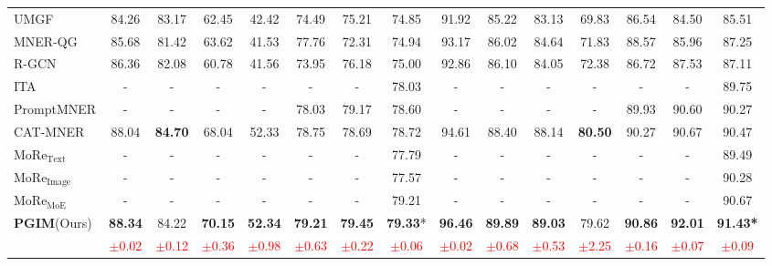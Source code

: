 \documentclass[11pt]{article}
\begin{document}
\begin{table*}[!]
\begin{tabular}{lcccccccccccccc}
UMGF & \multicolumn{1}{|c}{84.26} & 83.17 & 62.45 &\multicolumn{1}{c|}{42.42} & 74.49 & 75.21 &  \multicolumn{1}{c|}{74.85} &  91.92 &  85.22 &  83.13 &
  \multicolumn{1}{c|}{69.83} &  86.54 &  84.50 & 85.51 \\
MNER-QG & \multicolumn{1}{|c}{85.68} &  81.42 &  63.62 &  \multicolumn{1}{c|}{41.53} &77.76 & 72.31 &  \multicolumn{1}{c|}{74.94} &  93.17 &  86.02 & 84.64 &  \multicolumn{1}{c|}{71.83} & 88.57 &  85.96 &  87.25 \\ 
R-GCN &  \multicolumn{1}{|c}{86.36} &  82.08 &  60.78 &\multicolumn{1}{c|}{41.56} &  73.95 &  76.18 &  \multicolumn{1}{c|}{75.00} &  92.86 &  86.10 &  84.05 &  \multicolumn{1}{c|}{72.38} &  86.72 &  87.53 &  87.11 \\
ITA &  \multicolumn{1}{|c}{-} &  - &  - &  \multicolumn{1}{c|}{-} &  - &  - &  \multicolumn{1}{c|}{78.03} &  - &  - &  - &  \multicolumn{1}{c|}{-} &  - &  - &  89.75 \\
PromptMNER &  \multicolumn{1}{|c}{-} &  - &  - &  \multicolumn{1}{c|}{-} &  78.03 &  79.17 &  \multicolumn{1}{c|}{78.60} &  - &  - &  - &\multicolumn{1}{c|}{-} &  89.93 &  90.60 &  90.27 \\
CAT-MNER &  \multicolumn{1}{|c}{88.04} &  \textbf{84.70} &  68.04 &  \multicolumn{1}{c|}{52.33} &  78.75 &  78.69 &  \multicolumn{1}{c|}{78.72} &  94.61 &  88.40 &  88.14 &  \multicolumn{1}{c|}{\textbf{80.50}} &  90.27 &  90.67 &  90.47\\
MoRe${_{\text{Text}}}$ &  \multicolumn{1}{|c}{-} &  - &  - &  \multicolumn{1}{c|}{-} &  - &  - &
\multicolumn{1}{c|}{77.79} &  - &- &  - &  \multicolumn{1}{c|}{-} &  - &  - &  89.49 \\
MoRe${_{\text{Image}}}$ &  \multicolumn{1}{|c}{-} &  - &  - &  \multicolumn{1}{c|}{-} &  - &  - &
\multicolumn{1}{c|}{77.57} &  - &- &  - &  \multicolumn{1}{c|}{-} &  - &  - &  90.28 \\
MoRe${_{\text{MoE}}}$ &  \multicolumn{1}{|c}{-} &  - &  - &  \multicolumn{1}{c|}{-} &  - &  - &
\multicolumn{1}{c|}{79.21} &  - &- &  - &  \multicolumn{1}{c|}{-} &  - &  - &  90.67 \\
\textbf{PGIM}(Ours) &  \multicolumn{1}{|c}{\textbf{88.34}} &  84.22 &  \textbf{70.15} &  \multicolumn{1}{c|}{\textbf{52.34}} &  \textbf{79.21} &  \textbf{79.45} &  \multicolumn{1}{c|}{\textbf{79.33}*} &  \textbf{96.46} &  \textbf{89.89} &  \textbf{89.03} &  \multicolumn{1}{c|}{79.62} &  \textbf{90.86} &  \textbf{92.01} & \textbf{91.43*} \\
      &  \multicolumn{1}{|c}{\textcolor{red}{$\pm$0.02}} &  \textcolor{red}{$\pm$0.12} &  \textcolor{red}{$\pm$0.36} &  \multicolumn{1}{c|}{\textcolor{red}{$\pm$0.98}} &  \textcolor{red}{$\pm$0.63} &  \textcolor{red}{$\pm$0.22} & 
\multicolumn{1}{c|}{\textcolor{red}{$\pm$0.06}} &  \textcolor{red}{$\pm$0.02} &\textcolor{red}{$\pm$0.68} &  \textcolor{red}{$\pm$0.53} &  \multicolumn{1}{c|}{\textcolor{red}{$\pm$2.25}} &  \textcolor{red}{$\pm$0.16} &  \textcolor{red}{$\pm$0.07} &  \textcolor{red}{$\pm$0.09} \\


\end{tabular}
\end{table*}
\end{document}
